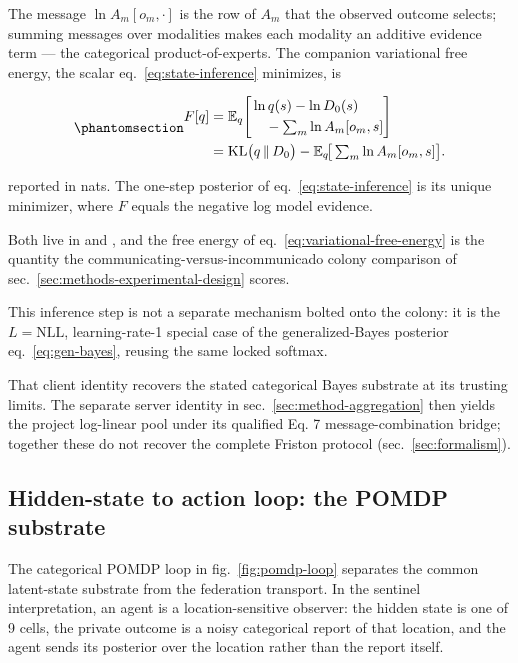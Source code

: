 \documentclass[
  english,
]{article}
\theoremstyle{plain}
\theoremstyle{definition}
\theoremstyle{remark}
\theoremstyle{definition}
\begin{document}
The message \(\ln A_m[o_m, \cdot]\) is the row of \(A_m\) that the
observed outcome selects; summing messages over modalities makes each
modality an additive evidence term --- the categorical
product-of-experts. The companion variational free energy, the scalar
eq.~\ref{eq:state-inference} minimizes, is

\begin{equation}\protect\phantomsection\label{eq:variational-free-energy}{\begin{aligned}
F[q]
&= \mathbb{E}_q\!\left[
\begin{aligned}
&\ln q(s) - \ln D_0(s)\\
&\quad - \textstyle\sum_m \ln A_m[o_m, s]
\end{aligned}
\right]\\
&= \mathrm{KL}\big(q \,\|\, D_0\big)
   - \mathbb{E}_q\!\big[\textstyle\sum_m \ln A_m[o_m, s]\big].
\end{aligned}}\end{equation}

reported in nats. The one-step posterior of eq.~\ref{eq:state-inference}
is its unique minimizer, where \(F\) equals the negative log model
evidence.

Both live in  and
, and the free energy of
eq.~\ref{eq:variational-free-energy} is the quantity the
communicating-versus-incommunicado colony comparison of
sec.~\ref{sec:methods-experimental-design} scores.

This inference step is not a separate mechanism bolted onto the colony:
it is the \(L=\mathrm{NLL}\), learning-rate-1 special case of the
generalized-Bayes posterior eq.~\ref{eq:gen-bayes}, reusing the same
locked softmax.

That client identity recovers the stated categorical Bayes substrate at
its trusting limits. The separate server identity in
sec.~\ref{sec:method-aggregation} then yields the project log-linear
pool under its qualified Eq. 7 message-combination bridge; together
these do not recover the complete Friston protocol
(sec.~\ref{sec:formalism}).

\subsection{Hidden-state to action loop: the POMDP
substrate}\label{sec:methods-pomdp-loop}

The categorical POMDP loop in fig.~\ref{fig:pomdp-loop} separates the
common latent-state substrate from the federation transport. In the
sentinel interpretation, an agent is a location-sensitive observer: the
hidden state is one of 9 cells, the private outcome is a noisy
categorical report of that location, and the agent sends its posterior
over the location rather than the report itself.
\end{document}
